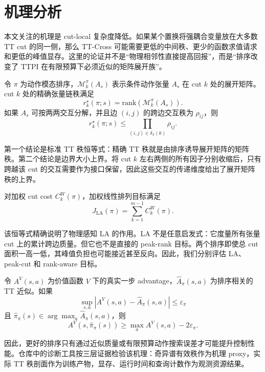 \section{机理分析}

本文关注的机理是 cut-local 复杂度降低。如果某个置换将强耦合变量放在大多数 TT cut 的同一侧，那么 TT-Cross 可能需要更低的中间秩、更少的函数求值请求和更低的峰值显存。这里的论证并不是“物理相邻性直接提高回报”，而是“排序改变了 TTPI 在有限预算下必须近似的矩阵展开族”。

\begin{proposition}
令 \(\pi\) 为动作模态排序，\(\mathcal{M}_k^\pi(A_s)\) 表示条件动作张量 \(A_s\) 在 cut \(k\) 处的展开矩阵。cut \(k\) 处的精确张量链秩满足
\[
r_k^\star(\pi;s)=\mathrm{rank}(\mathcal{M}_k^\pi(A_s)).
\]
如果 \(A_s\) 可按两两交互分解，并且边 \((i,j)\) 的跨边交互秩为 \(\rho_{ij}\)，则
\[
r_k^\star(\pi;s)\le \prod_{(i,j)\in\delta_\pi(k)} \rho_{ij}.
\]
\end{proposition}

第一个结论是标准 TT 秩恒等式：精确 TT 秩就是由排序诱导展开矩阵的矩阵秩。第二个结论是边界大小上界。将 cut \(k\) 左右两侧的所有因子分别收缩后，只有跨越该 cut 的交互需要作为接口保留，因此这些交互的传递维度给出了展开矩阵秩的上界。

\begin{lemma}
对加权 cut cost \(C_k^W(\pi)\)，加权线性排列目标满足
\[
J_{\mathrm{LA}}(\pi)=\sum_{k=1}^{m-1} C_k^W(\pi).
\]
\end{lemma}

该恒等式精确说明了物理感知 LA 的作用。LA 不是任意启发式：它度量所有张量 cut 上的累计跨边质量。但它也不是直接的 peak-rank 目标。两个排序即使总 cut 面积一高一低，其峰值负担也可能接近甚至反向。因此，我们分别评估 LA、peak-cut 和 rank-aware 目标。

\begin{lemma}
令 \(A^V(s,a)\) 为价值函数 \(V\) 下的真实一步 advantage，\(\widehat A_\pi(s,a)\) 为排序相关的 TT 近似。如果
\[
\sup_{s,a}|A^V(s,a)-\widehat A_\pi(s,a)|\le \varepsilon_\pi
\]
且 \(\widehat \pi_\pi(s)\in\arg\max_a \widehat A_\pi(s,a)\)，则
\[
A^V(s,\widehat \pi_\pi(s))\ge \max_a A^V(s,a)-2\varepsilon_\pi .
\]
\end{lemma}

因此，更好的排序只有通过近似质量或有限预算动作搜索误差才可能提升控制性能。仓库中的诊断工具按三层证据检验该机理：奇异谱有效秩作为机理 proxy，实际 TT 秩剖面作为训练产物，显存、运行时间和查询计数作为观测资源结果。
